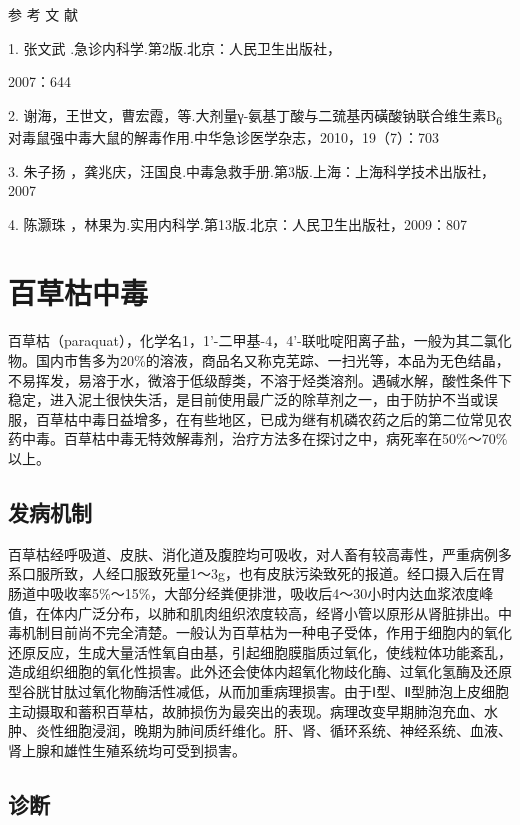 \hypertarget{text00144.htmlux5cux23CHP5-3-6-10}{}
参 考 文 献

1. 张文武 .急诊内科学.第2版.北京：人民卫生出版社，

2007：644

2.
谢海，王世文，曹宏霞，等.大剂量γ-氨基丁酸与二巯基丙磺酸钠联合维生素B\textsubscript{6}
对毒鼠强中毒大鼠的解毒作用.中华急诊医学杂志，2010，19（7）：703

3. 朱子扬
，龚兆庆，汪国良.中毒急救手册.第3版.上海：上海科学技术出版社，2007

4. 陈灏珠 ，林果为.实用内科学.第13版.北京：人民卫生出版社，2009：807

\protect\hypertarget{text00145.html}{}{}

\section{百草枯中毒}

百草枯（paraquat），化学名1，1'{-}二甲基-4，4'{-}联吡啶阳离子盐，一般为其二氯化物。国内市售多为20\%的溶液，商品名又称克芜踪、一扫光等，本品为无色结晶，不易挥发，易溶于水，微溶于低级醇类，不溶于烃类溶剂。遇碱水解，酸性条件下稳定，进入泥土很快失活，是目前使用最广泛的除草剂之一，由于防护不当或误服，百草枯中毒日益增多，在有些地区，已成为继有机磷农药之后的第二位常见农药中毒。百草枯中毒无特效解毒剂，治疗方法多在探讨之中，病死率在50\%～70\%以上。

\subsection{发病机制}

百草枯经呼吸道、皮肤、消化道及腹腔均可吸收，对人畜有较高毒性，严重病例多系口服所致，人经口服致死量1～3g，也有皮肤污染致死的报道。经口摄入后在胃肠道中吸收率5\%～15\%，大部分经粪便排泄，吸收后4～30小时内达血浆浓度峰值，在体内广泛分布，以肺和肌肉组织浓度较高，经肾小管以原形从肾脏排出。中毒机制目前尚不完全清楚。一般认为百草枯为一种电子受体，作用于细胞内的氧化还原反应，生成大量活性氧自由基，引起细胞膜脂质过氧化，使线粒体功能紊乱，造成组织细胞的氧化性损害。此外还会使体内超氧化物歧化酶、过氧化氢酶及还原型谷胱甘肽过氧化物酶活性减低，从而加重病理损害。由于Ⅰ型、Ⅱ型肺泡上皮细胞主动摄取和蓄积百草枯，故肺损伤为最突出的表现。病理改变早期肺泡充血、水肿、炎性细胞浸润，晚期为肺间质纤维化。肝、肾、循环系统、神经系统、血液、肾上腺和雄性生殖系统均可受到损害。

\subsection{诊断}

